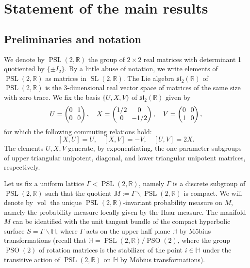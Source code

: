 \documentclass[JEP,XML,SOM,NoEqCountersInSection,Unicode,published]{cedram}
\newcommand \R{\mathbb{R}}
\newcommand \Hbb{\mathbb{H}}
\DeclareMathOperator{\SL}{SL}
\DeclareMathOperator{\PSL}{PSL}
\DeclareMathOperator{\PSO}{PSO}
\DeclareMathOperator{\vol}{vol}
\theoremstyle{definition}
\begin{document}
\section{Statement of the main results}\label{sec:statement}

\subsection{Preliminaries and notation}

We denote by $\PSL(2,\R)$ the group of $2 \times 2$ real matrices with determinant 1 quotiented by $\{\pm I_2\}$.
By a little abuse of notation, we write elements of $\PSL(2,\R)$ as matrices in $\SL(2,\R)$.
The Lie algebra $\mathfrak{sl}_2(\R)$ of $\PSL(2,\R)$ is the 3-dimensional real vector space of matrices of the same size with zero trace.
We fix the basis $\{ U,X,V \}$ of $\mathfrak{sl}_2(\R)$ given by\vspace*{-3pt}
\[\arraycolsep3.5pt
U =
\begin{pmatrix}
0 & 1 \\
0 & 0
\end{pmatrix},
\ \ \
X =
\begin{pmatrix}
1/2 & 0 \\
0 & -1/2
\end{pmatrix},
\ \ \
V =
\begin{pmatrix}
0 & 0 \\
1 & 0
\end{pmatrix},
\]
for which the following commuting relations hold:\vspace*{-3pt}
\[
[X,U] = U, \quad [X,V] = -V, \quad [U,V]= 2X.
\]
The elements $U, X, V$ generate, by exponentiating, the one-parameter subgroups of upper triangular unipotent, diagonal, and lower triangular unipotent matrices, respectively.

Let us fix a uniform lattice $\Gamma < \PSL(2,\R)$, namely $\Gamma$ is a discrete subgroup of $\PSL(2,\R)$ such that the quotient $M := \Gamma \backslash \PSL(2,\R)$ is compact.
We will denote by $\vol$ the unique $\PSL(2,\R)$-invariant probability measure on $M$, namely the probability measure locally given by the Haar measure.
The manifold $M$ can be identified with the unit tangent bundle of the compact hyperbolic surface $S = \Gamma \backslash \Hbb$, where $\Gamma$ acts on the upper half plane $\Hbb$ by Möbius transformations (recall that $\Hbb = \PSL(2,\R) / \PSO(2)$, where the group $\PSO(2)$ of rotation matrices is the stabilizer of the point $i \in \Hbb$ under the transitive action of $\PSL(2,\R)$ on $\Hbb$ by Möbius transformations).
\end{document}
